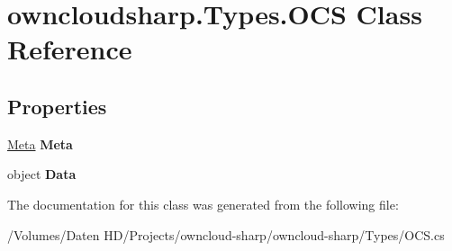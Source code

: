 \hypertarget{classowncloudsharp_1_1_types_1_1_o_c_s}{}\section{owncloudsharp.\+Types.\+O\+C\+S Class Reference}
\label{classowncloudsharp_1_1_types_1_1_o_c_s}
\subsection*{Properties}
\begin{DoxyCompactItemize}
\item 
\hypertarget{classowncloudsharp_1_1_types_1_1_o_c_s_a7fed97a3502a80df264f5c38651be4c1}{}\hyperlink{classowncloudsharp_1_1_types_1_1_meta}{Meta} {\bfseries Meta}\label{classowncloudsharp_1_1_types_1_1_o_c_s_a7fed97a3502a80df264f5c38651be4c1}

\item 
\hypertarget{classowncloudsharp_1_1_types_1_1_o_c_s_ad64d4fa0e0f73ba19a0eb97b9d30f2bd}{}object {\bfseries Data}\label{classowncloudsharp_1_1_types_1_1_o_c_s_ad64d4fa0e0f73ba19a0eb97b9d30f2bd}

\end{DoxyCompactItemize}


The documentation for this class was generated from the following file\+:\begin{DoxyCompactItemize}
\item 
/\+Volumes/\+Daten H\+D/\+Projects/owncloud-\/sharp/owncloud-\/sharp/\+Types/O\+C\+S.\+cs\end{DoxyCompactItemize}
